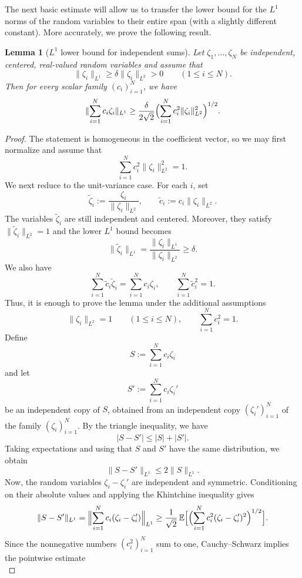 \documentclass[11pt]{amsart}
\numberwithin{equation}{section}
\newtheorem{lemma}[theorem]{Lemma}
\theoremstyle{definition}
\theoremstyle{remark}
\newcommand{\E}{\mathbb E}
\newcommand{\abs}[1]{\lvert #1 \rvert}
\newcommand{\norm}[1]{\lVert #1 \rVert}
\begin{document}
The next basic estimate  will allow us to transfer the lower bound for the $L^1$ norms of the random variables to their entire span (with a slightly different constant). More accurately, we prove the following result.

\begin{lemma}[$L^1$ lower bound for independent sums]\label{lem:l1lower}
Let $\zeta_1,\dots,\zeta_N$ be independent, centered, real-valued random variables and
assume that
\[
\norm{\zeta_i}_{L^1}\ge \delta \norm{\zeta_i}_{L^2}>0
\qquad(1\le i\le N).
\]
Then for every scalar family $(c_i)_{i=1}^N$, we have
\[
\norm{\sum_{i=1}^N c_i\zeta_i}_{L^1}
\ge
\frac{\delta}{2\sqrt2}
\Bigl(\sum_{i=1}^N c_i^2\norm{\zeta_i}_{L^2}^2\Bigr)^{1/2}.
\]
\end{lemma}

\begin{proof}
The statement is homogeneous in the coefficient vector, so we may first
normalize and assume that
\[
\sum_{i=1}^N c_i^2\norm{\zeta_i}_{L^2}^2=1.
\]
We next reduce to the unit-variance case.  For each $i$, set
\[
\widetilde\zeta_i:=\frac{\zeta_i}{\norm{\zeta_i}_{L^2}},
\qquad
\widetilde c_i:=c_i\norm{\zeta_i}_{L^2}.
\]
The variables $\widetilde\zeta_i$ are still independent and centered. Moreover, they satisfy $\norm{\widetilde\zeta_i}_{L^2}=1$ and the lower $L^1$ bound
becomes
\[
\norm{\widetilde\zeta_i}_{L^1}
=\frac{\norm{\zeta_i}_{L^1}}{\norm{\zeta_i}_{L^2}}
\ge \delta.
\]
We also have
\[
\sum_{i=1}^N \widetilde c_i \widetilde\zeta_i
=\sum_{i=1}^N c_i\zeta_i,
\qquad
\sum_{i=1}^N \widetilde c_i^2
=1.
\]
Thus, it is enough to prove the lemma under the additional assumptions
\[
\norm{\zeta_i}_{L^2}=1
\qquad(1\le i\le N),
\qquad
\sum_{i=1}^N c_i^2=1.
\]
Define
\[
S:=\sum_{i=1}^N c_i\zeta_i
\]
and let
\[
S':=\sum_{i=1}^N c_i\zeta_i'
\]
be an independent copy of $S$, obtained from an independent copy
$(\zeta_i')_{i=1}^N$ of the family $(\zeta_i)_{i=1}^N$.
By the triangle inequality, we have
\[
\abs{S-S'}\le \abs{S}+\abs{S'}.
\]
Taking expectations and using that $S$ and $S'$ have the same distribution, we
obtain
\[
\norm{S-S'}_{L^1}\le 2\norm{S}_{L^1}.
\]
Now, the random variables $\zeta_i-\zeta_i'$ are independent and symmetric.
Conditioning on their absolute values and applying the Khintchine inequality
gives
\[
\norm{S-S'}_{L^1}
=
\Bigl\|\sum_{i=1}^N c_i(\zeta_i-\zeta_i')\Bigr\|_{L^1}
\ge
\frac{1}{\sqrt2}\,
\E\Bigl[\Bigl(\sum_{i=1}^N c_i^2(\zeta_i-\zeta_i')^2\Bigr)^{1/2}\Bigr].
\]
Since the nonnegative numbers $(c_i^2)_{i=1}^N$ sum to one, Cauchy--Schwarz
implies the pointwise estimate
\[
\]
\end{proof}
\end{document}

